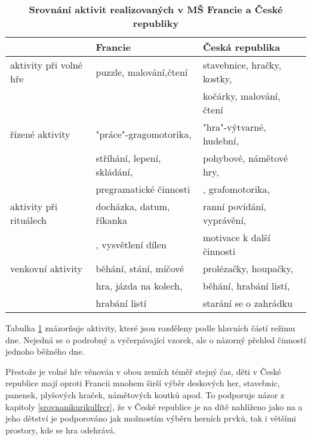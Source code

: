 \begin{table}[h]
	
	\begin{tabular}{|l|l|l|}
	\hline
	\rowcolor{grey}
								& \textbf{Francie}				& \textbf{Česká republika}	\\
	\hline
	\hline
\rowcolor{grey!10}	 aktivity při volné hře	&puzzle, malování,čtení 	&stavebnice, hračky, kostky,\\ 
\rowcolor{grey!10}	 						&							&kočárky, malování, čtení \\ 
\rowcolor{grey!50}	 řízené aktivity  		&"práce"-gragomotorika, 	&"hra"-výtvarné, hudební, \\ 
\rowcolor{grey!50}	 						&stříhání, lepení, skládání,&pohybové, námětové hry, \\ 
\rowcolor{grey!50}	 						&pregramatické činnosti 	&, grafomotorika, \\
\rowcolor{grey!10}	 aktivity při rituálech &docházka, datum, říkanka 	&ranní povídání, vyprávění,\\ 
\rowcolor{grey!10}	 						&, vysvětlení dílen			& motivace k další činnosti\\ 
\rowcolor{grey!50}   venkovní aktivity 		& běhání, stání, míčové		& prolézačky, houpačky, \\
\rowcolor{grey!50}							&hra, jázda na kolech, 		&běhání, hrabání listí,	\\
\rowcolor{grey!50}							&hrabání listí				&starání se o zahrádku	\\
	 \hline
	\end{tabular}
	
	\caption{ \textbf{Srovnání aktivit realizovaných v MŠ Francie a České republiky}
	}
	\label{srovnaniaktivit}
\end{table}

	Tabulka \ref{srovnaniaktivit} znázorňuje aktivity, které jsou rozděleny podle hlavních částí režimu dne. Nejedná se o podrobný a vyčerpávající vzorek, ale o názorný přehled činností jednoho běžného dne. 

	Přestože je volné hře věnován v obou zemích téměř stejný čas, děti v České republice mají oproti Francii mnohem širší výběr deskových her, stavebnic, panenek, plyšových hraček, námětových koutků apod. To podporuje názor z kapitoly \ref{srovnanikurikulfrcr}, že v České republice je na dítě nahlíženo jako na  a jeho dětství je podporováno jak možnostím výběru herních prvků, tak i většími prostory, kde se hra odehrává. 

